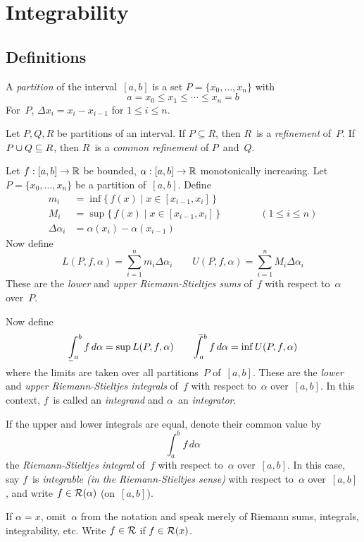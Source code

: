 %
%
%
\section{Integrability}
\subsection*{Definitions}
\begin{defn}
A \emph{partition} of the interval~\([a,b]\) is a set \(P=\{x_0,\ldots,x_n\}\) with
\[a=x_0\le x_1\le\cdots\le x_n=b\]
For~\(P\), \(\Delta x_i=x_i-x_{i-1}\) for \(1\le i\le n\).
\end{defn}

\begin{defn}
Let \(P,Q,R\) be partitions of an interval. If \(P\subseteq R\), then \(R\)~is a \emph{refinement} of~\(P\). If \(P\cup Q\subseteq R\), then \(R\)~is a \emph{common refinement} of \(P\)~and~\(Q\).
\end{defn}

\begin{defn}
Let \(f:[a,b]\to\mathbb{R}\) be bounded, \(\alpha:[a,b]\to\mathbb{R}\) monotonically increasing. Let \(P=\{x_0,\ldots,x_n\}\) be a partition of~\([a,b]\). Define
\begin{align*}
m_i&=\inf\{\,f(x)\mid x\in[x_{i-1},x_i]\,\}\\
M_i&=\sup\{\,f(x)\mid x\in[x_{i-1},x_i]\,\}\qquad\qquad(1\le i\le n)\\
\Delta\alpha_i&=\alpha(x_i)-\alpha(x_{i-1})
\end{align*}
Now define
\[L(P,f,\alpha)=\sum_{i=1}^n m_i\Delta\alpha_i\qquad U(P,f,\alpha)=\sum_{i=1}^n M_i\Delta\alpha_i\]
These are the \emph{lower} and \emph{upper} \emph{Riemann-Stieltjes sums} of~\(f\) with respect to~\(\alpha\) over~\(P\).

Now define
\[\lowerint{a}{b}f\,d\alpha=\sup L(P,f,\alpha)\qquad\upperint{a}{b}f\,d\alpha=\inf U(P,f,\alpha)\]
where the limits are taken over all partitions~\(P\) of~\([a,b]\). These are the \emph{lower} and \emph{upper} \emph{Riemann-Stieltjes integrals} of~\(f\) with respect to~\(\alpha\) over~\([a,b]\). In this context, \(f\)~is called an \emph{integrand} and \(\alpha\)~an \emph{integrator}.

If the upper and lower integrals are equal, denote their common value by
\[\int_a^b f\,d\alpha\]
the \emph{Riemann-Stieltjes integral} of~\(f\) with respect to~\(\alpha\) over~\([a,b]\). In this case, say \(f\)~is \emph{integrable (in the Riemann-Stieltjes sense)} with respect to~\(\alpha\) over~\([a,b]\), and write \(f\in\mathcal{R}(\alpha)\) (on~\([a,b]\)).

If \(\alpha=x\), omit~\(\alpha\) from the notation and speak merely of Riemann sums, integrals, integrability, etc. Write \(f\in\mathcal{R}\) if \(f\in\mathcal{R}(x)\).
\end{defn}

